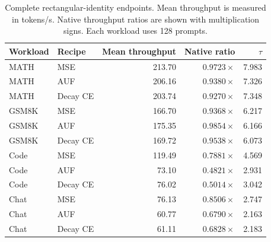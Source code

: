 \begin{table}[htbp]
\centering
\caption{Complete rectangular-identity endpoints. Mean throughput is measured in tokens/s. Native throughput ratios are shown with multiplication signs. Each workload uses 128 prompts.}
\label{tab:app-identity-endpoints}
\small
\begin{tabular}{llrrr}
\toprule
Workload & Recipe & Mean throughput & Native ratio & $\tau$ \\
\midrule
MATH & MSE & 213.70 & $0.9723\times$ & 7.983 \\
MATH & AUF & 206.16 & $0.9380\times$ & 7.326 \\
MATH & Decay CE & 203.74 & $0.9270\times$ & 7.348 \\
GSM8K & MSE & 166.70 & $0.9368\times$ & 6.217 \\
GSM8K & AUF & 175.35 & $0.9854\times$ & 6.166 \\
GSM8K & Decay CE & 169.72 & $0.9538\times$ & 6.073 \\
Code & MSE & 119.49 & $0.7881\times$ & 4.569 \\
Code & AUF & 73.10 & $0.4821\times$ & 2.931 \\
Code & Decay CE & 76.02 & $0.5014\times$ & 3.042 \\
Chat & MSE & 76.13 & $0.8506\times$ & 2.747 \\
Chat & AUF & 60.77 & $0.6790\times$ & 2.163 \\
Chat & Decay CE & 61.11 & $0.6828\times$ & 2.183 \\
\bottomrule
\end{tabular}
\end{table}

